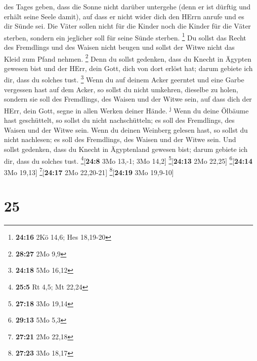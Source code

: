 des Tages geben, dass die Sonne nicht darüber untergehe (denn er ist
dürftig und erhält seine Seele damit), auf dass er nicht wider dich den
HErrn anrufe und es dir Sünde sei.  Die Väter sollen
nicht für die Kinder noch die Kinder für die Väter sterben, sondern ein
jeglicher soll für seine Sünde sterben. \footnote{\textbf{24:16} 2Kö
  14,6; Hes 18,19-20}  Du sollst das Recht des Fremdlings
und des Waisen nicht beugen und sollst der Witwe nicht das Kleid zum
Pfand nehmen. \footnote{\textbf{28:27} 2Mo 9,9}  Denn du
sollst gedenken, dass du Knecht in Ägypten gewesen bist und der HErr,
dein Gott, dich von dort erlöst hat; darum gebiete ich dir, dass du
solches tust. \footnote{\textbf{24:18} 5Mo 16,12}  Wenn
du auf deinem Acker geerntet und eine Garbe vergessen hast auf dem
Acker, so sollst du nicht umkehren, dieselbe zu holen, sondern sie soll
des Fremdlings, des Waisen und der Witwe sein, auf dass dich der HErr,
dein Gott, segne in allen Werken deiner Hände. \textsuperscript{j}
 Wenn du deine Ölbäume hast geschüttelt, so sollst du
nicht nachschütteln; es soll des Fremdlings, des Waisen und der Witwe
sein.  Wenn du deinen Weinberg gelesen hast, so sollst du
nicht nachlesen; es soll des Fremdlings, des Waisen und der Witwe sein.
 Und sollst gedenken, dass du Knecht in Ägyptenland
gewesen bist; darum gebiete ich dir, dass du solches tust.
\footnote{\textbf{25:5} Rt 4,5; Mt 22,24}{[}\textbf{24:8} 3Mo 13,-1; 3Mo
14,2{]} \footnote{\textbf{27:18} 3Mo 19,14}{[}\textbf{24:13} 2Mo
22,25{]} \footnote{\textbf{29:13} 5Mo 5,3}{[}\textbf{24:14} 3Mo 19,13{]}
\footnote{\textbf{27:21} 2Mo 22,18}{[}\textbf{24:17} 2Mo 22,20-21{]}
\footnote{\textbf{27:23} 3Mo 18,17}{[}\textbf{24:19} 3Mo 19,9-10{]}

\hypertarget{section-24}{%
\section{25}\label{section-24}}

